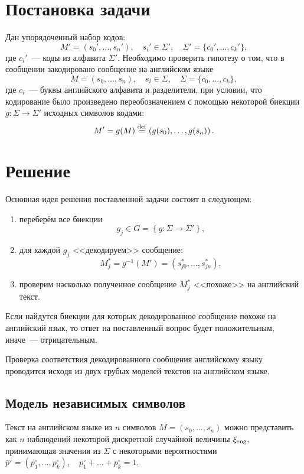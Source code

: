 \documentclass[a4paper,10pt]{article}
\begin{document}



\section{Постановка задачи}
Дан упорядоченный набор кодов:
$$M' = (s_0', \ldots, s_n'), \quad s_i' \in \Sigma', \quad \Sigma' = \{ c_0', \ldots, c_k' \},$$
где $c_i'$~--- коды из алфавита $\Sigma'$.
Необходимо проверить гипотезу о том, что в сообщении закодировано сообщение 
на английском языке
$$M = (s_0, \ldots, s_n), \quad s_i \in \Sigma, \quad \Sigma = \{ c_0, \ldots, c_k \},$$
где $c_i$~--- буквы английского алфавита и разделители, 
при условии, что кодирование было произведено 
переобозначением с помощью некоторой биекции 
$g \colon \Sigma \rightarrow \Sigma'$ 
исходных символов кодами: 
$$M' = g(M) \stackrel{\rm def}{=} \left (g(s_0), \ldots, g(s_n) \right).$$

\section{Решение}
Основная идея решения поставленной задачи состоит в следующем: 
\begin{enumerate}
  \item переберём все биекции
  $$g_j \in G = \left \{ g \colon \Sigma \rightarrow \Sigma' \right \},$$ 
  \item для каждой $g_j$ <<декодируем>> сообщение: 
  $$M^{*}_j = g^{-1}(M') = (s_{j0}^{*}, \ldots, s_{jn}^{*}),$$
  \item проверим насколько полученное сообщение $M^{*}_j$ <<похоже>> на 
  английский текст.
\end{enumerate}
Если найдутся биекции для которых декодированное сообщение похоже на английский
язык, то ответ на поставленный вопрос будет положительным, 
иначе~--- отрицательным.

Проверка соответствия декодированного сообщения английскому языку проводится
исходя из двух грубых моделей текстов на английском языке.

\subsection{Модель независимых символов}
Текст на английском языке из $n$ символов $M = (s_0, \ldots, s_n)$
можно представить как $n$ наблюдений некоторой дискретной случайной
величины $\xi_{\rm eng},$ принимающая значения из $\Sigma$ 
с некоторыми вероятностями 
$\bar{p}^\circ = (p_1^{\circ}, \ldots, p_k^{\circ}), \quad
p_1^{\circ} + \ldots + p_k^{\circ} = 1$.
\end{document}
